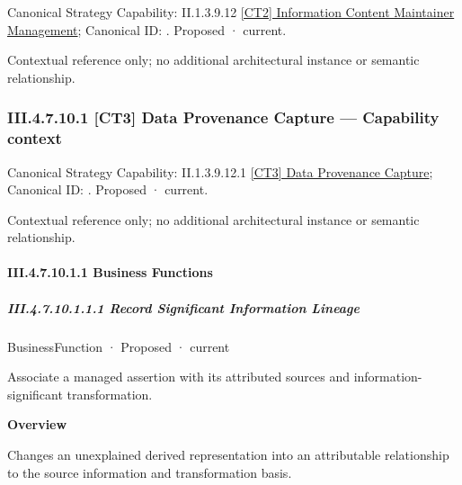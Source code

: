 {\small Canonical Strategy Capability: II.1.3.9.12 \hyperref[element:b81a1ab42af24c2e9896b8f3f78d291a]{[CT2] Information Content Maintainer Management}; Canonical ID: \texttt{}. Proposed · current.}\par
Contextual reference only; no additional architectural instance or semantic relationship.\par
\subsubsection*{III.4.7.10.1 [CT3] Data Provenance Capture — Capability context}
\label{navigation:III.4.7.10.1}

{\small Canonical Strategy Capability: II.1.3.9.12.1 \hyperref[element:44a7937520a54945b06b5fd4a2bbd870]{[CT3] Data Provenance Capture}; Canonical ID: \texttt{}. Proposed · current.}\par
Contextual reference only; no additional architectural instance or semantic relationship.\par
\paragraph*{III.4.7.10.1.1 Business Functions}
\label{navigation:III.4.7.10.1.1}

\subparagraph*{III.4.7.10.1.1.1 Record Significant Information Lineage}
\label{navigation:III.4.7.10.1.1.1}

\label{element:afdb0358393f4560b926330a14c1aedd}
{\small BusinessFunction · Proposed · current}\par

Associate a managed assertion with its attributed sources and information-significant transformation.



\textbf{Overview}



Changes an unexplained derived representation into an attributable relationship to the source information and transformation basis.




